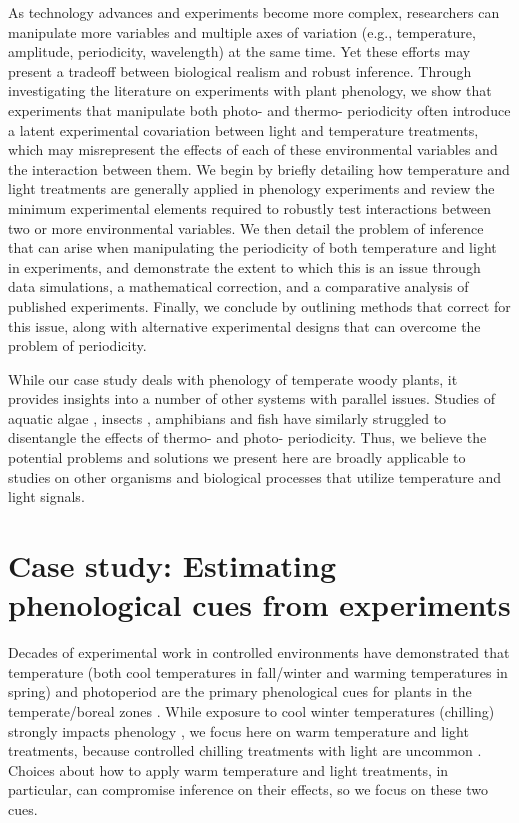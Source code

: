 \documentclass[11pt]{article}
\begin{document}
As technology advances and experiments become more complex, researchers can manipulate more variables and multiple axes of variation (e.g., temperature, amplitude, periodicity, wavelength) at the same time. Yet these efforts may present a tradeoff between biological realism and robust inference. Through investigating the literature on experiments with plant phenology, we show that experiments that manipulate both photo- and thermo- periodicity often introduce a latent experimental covariation between light and temperature treatments, which may misrepresent the effects of each of these environmental variables and the interaction between them. We begin by briefly detailing how temperature and light treatments are generally applied in phenology experiments and review the minimum experimental elements required to robustly test interactions between two or more environmental variables. We then detail the problem of inference that can arise when manipulating the periodicity of both temperature and light in experiments, and demonstrate the extent to which this is an issue through data simulations, a mathematical correction, and a comparative analysis of published experiments. Finally, we conclude by outlining methods that correct for this issue, along with alternative experimental designs that can overcome the problem of periodicity. 

While our case study deals with phenology of temperate woody plants, it provides insights into a number of other systems with parallel issues. Studies of aquatic algae \citep{XU2019167}, insects \citep{ANDUAGA201846}, amphibians \citep{WRIGHT200433} and fish \citep{Olemda_2009} have similarly struggled to disentangle the effects of thermo- and photo- periodicity.  Thus, we believe the potential problems and solutions we present here are broadly applicable to studies on other organisms and biological processes that utilize temperature and light signals. 

\section*{Case study: Estimating phenological cues from experiments}
Decades of experimental work in controlled environments have demonstrated that temperature (both cool temperatures in fall/winter and warming temperatures in spring) and photoperiod are the primary phenological cues for plants in the temperate/boreal zones \citep{Ettinger:2020aa}. While exposure to cool winter temperatures (chilling) strongly impacts phenology \citep{Laube2014}, we focus here on warm temperature and light treatments, because controlled chilling treatments with light are uncommon \citep{Wolkovich:2022ue}. Choices about how to apply warm temperature and light treatments, in particular, can compromise inference on their effects, so we focus on these two cues.
\end{document}
